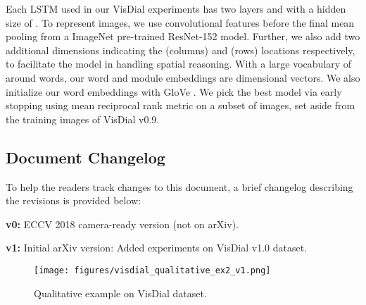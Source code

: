 \documentclass[runningheads]{llncs}
\begin{document}
Each LSTM used in our VisDial experiments has two layers and with a hidden size
of .
To represent images, we use convolutional features before the final mean pooling
from a ImageNet pre-trained ResNet-152 \cite{he16cvpr} model.
Further, we also add two additional dimensions indicating the  (columns) and 
 (rows) locations respectively, to facilitate the model in handling
spatial reasoning.
With a large vocabulary of around  words, our word and module embeddings 
are  dimensional vectors.
We also initialize our word embeddings with GloVe \cite{pennington2014glove}.
We pick the best model via early stopping using mean
reciprocal rank metric on a subset of  images, set aside from the
 training images of VisDial v0.9.

\subsection{Document Changelog}
To help the readers track changes to this document, a brief changelog 
describing the revisions is provided below:

\begin{description}
\item{\textbf{v0:}} ECCV 2018 camera-ready version (not on arXiv).
\item{\textbf{v1:}} Initial arXiv version: Added experiments on VisDial v1.0 dataset.
\end{description}
\vspace*{-10pt} 
\begin{figure}
	\centering
    \texttt{[image: figures/visdial\_qualitative\_ex2\_v1.png]}
    \caption{
    Qualitative example on VisDial dataset.}
    \label{fig:visdial_qual_2}
\end{figure} 
\small


\end{document}
